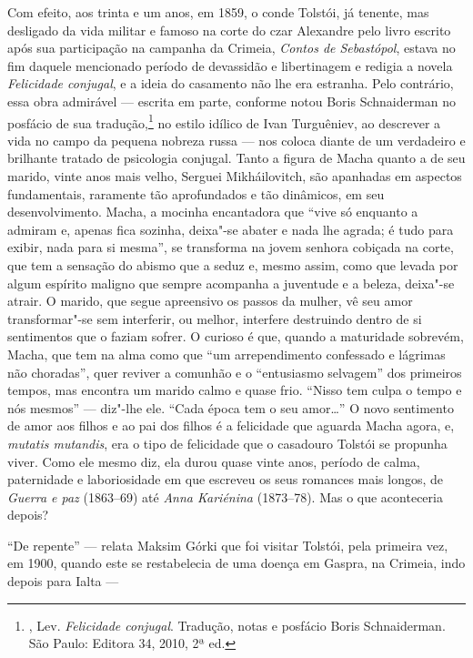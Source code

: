 Com efeito, aos trinta e um anos, em 1859, o conde Tolstói,
já tenente, mas desligado da vida militar e famoso na corte do czar
Alexandre  pelo livro escrito após sua participação na campanha da
Crimeia, \emph{Contos de Sebastópol}, estava no fim daquele mencionado período de devassidão e
libertinagem e redigia a novela \emph{Felicidade conjugal}, e a ideia do casamento
não lhe era estranha. Pelo contrário, essa obra admirável ---
escrita em parte, conforme notou Boris Schnaiderman no posfácio de
sua tradução,\footnote{, Lev. \emph{Felicidade
conjugal}. Tradução, notas e posfácio Boris Schnaiderman. São
Paulo: Editora 34, 2010, 2ª ed.} no estilo idílico de Ivan
Turguêniev, ao descrever a vida no campo da pequena nobreza russa
--- nos coloca diante de um verdadeiro e brilhante tratado de
psicologia conjugal. Tanto a figura de Macha quanto a de seu
marido, vinte anos mais velho, Serguei Mikháilovitch, são
apanhadas em aspectos fundamentais, raramente tão aprofundados e
tão dinâmicos, em seu desenvolvimento. Macha, a mocinha
encantadora que ``vive só enquanto a admiram e, apenas fica
sozinha, deixa"-se abater e nada lhe agrada; é tudo para exibir,
nada para si mesma'', se transforma na jovem senhora cobiçada na
corte, que tem a sensação do abismo que a seduz e, mesmo assim,
como que levada por algum espírito maligno que sempre acompanha a
juventude e a beleza, deixa"-se atrair. O marido, que segue
apreensivo os passos da mulher, vê seu amor transformar"-se sem
interferir, ou melhor, interfere destruindo dentro de si
sentimentos que o faziam sofrer. O curioso é que, quando a
maturidade sobrevém, Macha, que tem na alma como que ``um
arrependimento confessado e lágrimas não choradas'', quer reviver
a comunhão e o ``entusiasmo selvagem'' dos primeiros tempos, mas
encontra um marido calmo e quase frio. ``Nisso tem culpa o tempo
e nós mesmos'' --- diz"-lhe ele. ``Cada época tem o seu
amor\ldots{}'' O novo sentimento de amor aos filhos e ao pai dos
filhos é a felicidade que aguarda Macha agora, e, \emph{mutatis
mutandis}, era o tipo de felicidade que o casadouro Tolstói se
propunha viver. Como ele mesmo diz, ela durou quase vinte anos,
período de calma, paternidade e laboriosidade em que escreveu os
seus romances mais longos, de \emph{Guerra e paz} (1863--69) até
\emph{Anna Kariénina} (1873--78). Mas o que aconteceria depois?

``De repente'' --- relata Maksim Górki que foi visitar Tolstói, pela primeira vez, em 
1900, quando este se restabelecia de uma doença em Gaspra,
na Crimeia, indo depois para Ialta ---

